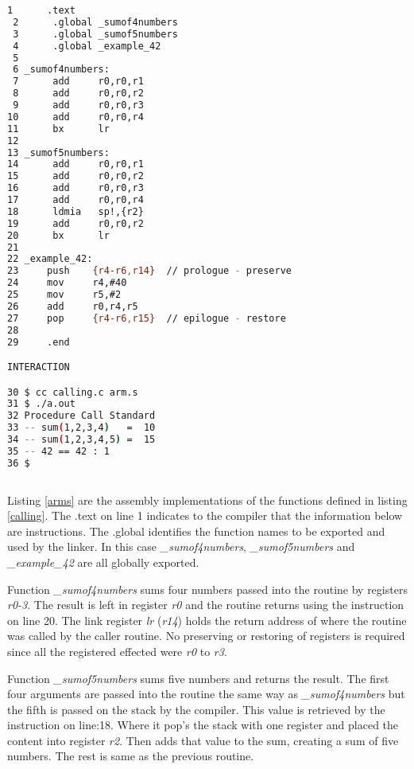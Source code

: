 \begin{lstlisting}[language=bash,showstringspaces=false,caption={File: arm.s},captionpos=b,label=arms]
 1      .text
 2      .global _sumof4numbers
 3      .global _sumof5numbers
 4      .global _example_42
 5 
 6 _sumof4numbers:
 7      add     r0,r0,r1
 8      add     r0,r0,r2
 9      add     r0,r0,r3
10      add     r0,r0,r4
11      bx      lr
12 
13 _sumof5numbers:
14      add     r0,r0,r1
15      add     r0,r0,r2
16      add     r0,r0,r3
17      add     r0,r0,r4
18      ldmia   sp!,{r2}
19      add     r0,r0,r2 
20      bx      lr
21 
22 _example_42:
23     push    {r4-r6,r14}  // prologue - preserve
24     mov     r4,#40
25     mov     r5,#2
26     add     r0,r4,r5
27     pop     {r4-r6,r15}  // epilogue - restore
28 
29     .end

INTERACTION

30 $ cc calling.c arm.s
31 $ ./a.out
32 Procedure Call Standard 
33 -- sum(1,2,3,4)   =  10
34 -- sum(1,2,3,4,5) =  15
35 -- 42 == 42 : 1
36 $
 
\end{lstlisting}

Listing \ref{arms} are the assembly implementations of the functions defined in listing \ref{calling}. The .text on line 1 indicates to the compiler that the information below are instructions. The .global identifies the function names to be exported and used by the linker. In this case \textit{\_sumof4numbers}, \textit{\_sumof5numbers} and \textit{\_example\_42} are all globally exported.

Function \textit{\_sumof4numbers} sums four numbers passed into the routine by registers \textit{r0-3}. The result is left in register \textit{r0} and the routine returns using the instruction on line 20. The link register \textit{lr} (\textit{r14}) holds the return address of where the routine was called by the caller routine. No preserving or restoring of registers is required since all the registered effected were \textit{r0} to \textit{r3}.

Function \textit{\_sumof5numbers} sums five numbers and returns the result. The first four arguments are passed into the routine the same way as \textit{\_sumof4numbers} but the fifth is passed on the stack by the compiler. This value is retrieved by the instruction on line:18. Where it pop's the stack with one register and placed the content into register \textit{r2}. Then adds that value to the sum, creating a sum of five numbers. The rest is same as the previous routine.

